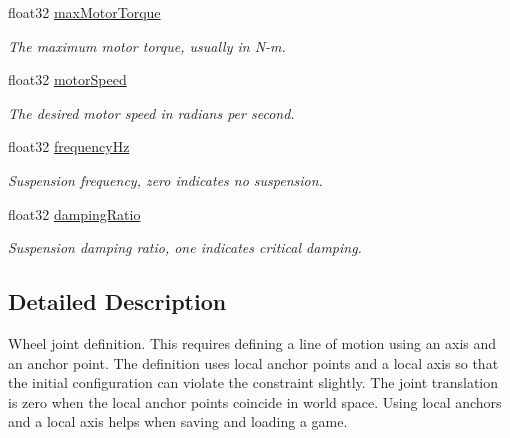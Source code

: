 \begin{DoxyCompactItemize}
float32 \mbox{\hyperlink{structb2WheelJointDef_ab658ce0fae40c6de09133659f7ffb829}{max\+Motor\+Torque}}
\begin{DoxyCompactList}\small\item\em The maximum motor torque, usually in N-\/m. \end{DoxyCompactList}\item 
\mbox{\label{structb2WheelJointDef_a7248e25f2ca6b6c2a5f7079ce16e7748}} 
float32 \mbox{\hyperlink{structb2WheelJointDef_a7248e25f2ca6b6c2a5f7079ce16e7748}{motor\+Speed}}
\begin{DoxyCompactList}\small\item\em The desired motor speed in radians per second. \end{DoxyCompactList}\item 
\mbox{\label{structb2WheelJointDef_acf3540f46eaf3bc91426386939bd37b1}} 
float32 \mbox{\hyperlink{structb2WheelJointDef_acf3540f46eaf3bc91426386939bd37b1}{frequency\+Hz}}
\begin{DoxyCompactList}\small\item\em Suspension frequency, zero indicates no suspension. \end{DoxyCompactList}\item 
\mbox{\label{structb2WheelJointDef_a9976584bfee18b46dec355764797ce54}} 
float32 \mbox{\hyperlink{structb2WheelJointDef_a9976584bfee18b46dec355764797ce54}{damping\+Ratio}}
\begin{DoxyCompactList}\small\item\em Suspension damping ratio, one indicates critical damping. \end{DoxyCompactList}\end{DoxyCompactItemize}


\subsection{Detailed Description}
Wheel joint definition. This requires defining a line of motion using an axis and an anchor point. The definition uses local anchor points and a local axis so that the initial configuration can violate the constraint slightly. The joint translation is zero when the local anchor points coincide in world space. Using local anchors and a local axis helps when saving and loading a game. 

